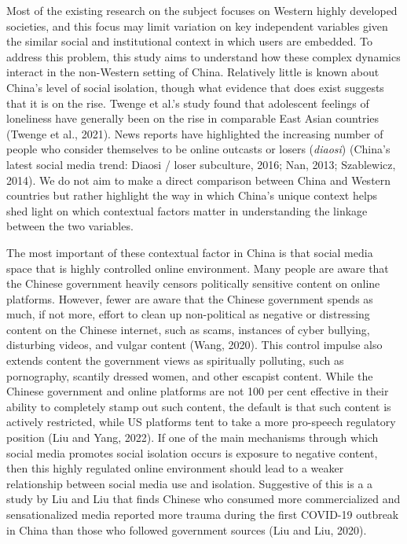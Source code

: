 \documentclass[
  letterpaper,
  DIV=11,
  numbers=noendperiod]{scrartcl}
\begin{document}
Most of the existing research on the subject focuses on Western highly
developed societies, and this focus may limit variation on key
independent variables given the similar social and institutional context
in which users are embedded. To address this problem, this study aims to
understand how these complex dynamics interact in the non-Western
setting of China. Relatively little is known about China's level of
social isolation, though what evidence that does exist suggests that it
is on the rise. Twenge et al.'s study found that adolescent feelings of
loneliness have generally been on the rise in comparable East Asian
countries (Twenge et al., 2021). News reports have highlighted the
increasing number of people who consider themselves to be online
outcasts or losers (\emph{diaosi}) (China{'}s latest social media trend:
Diaosi / loser subculture, 2016; Nan, 2013; Szablewicz, 2014). We do not
aim to make a direct comparison between China and Western countries but
rather highlight the way in which China's unique context helps shed
light on which contextual factors matter in understanding the linkage
between the two variables.

The most important of these contextual factor in China is that social
media space that is highly controlled online environment. Many people
are aware that the Chinese government heavily censors politically
sensitive content on online platforms. However, fewer are aware that the
Chinese government spends as much, if not more, effort to clean up
non-political as negative or distressing content on the Chinese
internet, such as scams, instances of cyber bullying, disturbing videos,
and vulgar content (Wang, 2020). This control impulse also extends
content the government views as spiritually polluting, such as
pornography, scantily dressed women, and other escapist content. While
the Chinese government and online platforms are not 100 per cent
effective in their ability to completely stamp out such content, the
default is that such content is actively restricted, while US platforms
tent to take a more pro-speech regulatory position (Liu and Yang, 2022).
If one of the main mechanisms through which social media promotes social
isolation occurs is exposure to negative content, then this highly
regulated online environment should lead to a weaker relationship
between social media use and isolation. Suggestive of this is a a study
by Liu and Liu that finds Chinese who consumed more commercialized and
sensationalized media reported more trauma during the first COVID-19
outbreak in China than those who followed government sources (Liu and
Liu, 2020).
\end{document}
